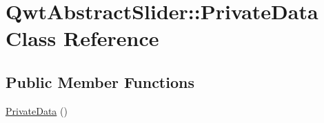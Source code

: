 \hypertarget{class_qwt_abstract_slider_1_1_private_data}{\section{Qwt\-Abstract\-Slider\-:\-:Private\-Data Class Reference}
\label{class_qwt_abstract_slider_1_1_private_data}
}
\subsection*{Public Member Functions}
\begin{DoxyCompactItemize}
\item 
\hyperlink{class_qwt_abstract_slider_1_1_private_data_a822dbe6ba830cc6c93b2835ef7f86100}{Private\-Data} ()
\end{DoxyCompactItemize}
